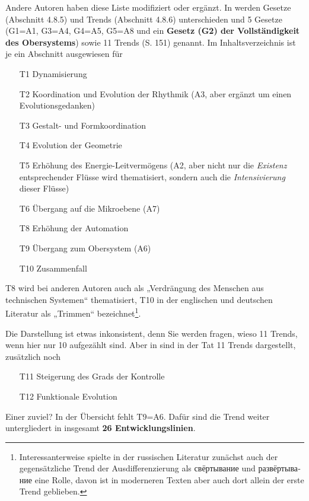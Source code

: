 \documentclass[11pt,a4paper]{article}
\begin{document}
Andere Autoren haben diese Liste modifiziert oder ergänzt.  In \cite[Abschnitt
  4.8]{Koltze2017} werden Gesetze (Abschnitt 4.8.5) und Trends (Abschnitt
4.8.6) unterschieden und 5 Gesetze (G1=A1, G3=A4, G4=A5, G5=A8 und ein
\textbf{Gesetz (G2) der Vollständigkeit des Obersystems}) sowie 11 Trends
(S. 151) genannt. Im Inhaltsverzeichnis ist je ein Abschnitt ausgewiesen für
\begin{itemize}[noitemsep]
\item[T1] Dynamisierung
\item[T2] Koordination und Evolution der Rhythmik (A3, aber ergänzt um einen
  Evolutionsgedanken)
\item[T3] Gestalt- und Formkoordination
\item[T4] Evolution der Geometrie
\item[T5] Erhöhung des Energie-Leitvermögens (A2, aber nicht nur die
  \emph{Existenz} entsprechender Flüsse wird thematisiert, sondern auch die
  \emph{Intensivierung} dieser Flüsse)
\item[T6] Übergang auf die Mikroebene (A7)
\item[T8] Erhöhung der Automation 
\item[T9] Übergang zum Obersystem (A6)
\item[T10] Zusammenfall 
\end{itemize}
\newpage
T8 wird bei anderen Autoren auch als „Verdrängung des Menschen aus technischen
Systemen“ thematisiert, T10 in der englischen und deutschen Literatur als
„Trimmen“ bezeichnet\footnote{Interessanterweise spielte in der russischen
  Literatur zunächst auch der gegensätzliche Trend der Ausdifferenzierung als
  \foreignlanguage{russian}{свёртывание} und
  \foreignlanguage{russian}{развёртывание} eine Rolle, davon ist in moderneren
  Texten aber auch dort allein der erste Trend geblieben.}.

Die Darstellung ist etwas inkonsistent, denn Sie werden fragen, wieso 11
Trends, wenn hier nur 10 aufgezählt sind. Aber in \cite[Abb. 4.65]{Koltze2017}
sind in der Tat 11 Trends dargestellt, zusätzlich noch
\begin{itemize}[noitemsep]
\item[T11] Steigerung des Grads der Kontrolle
\item[T12] Funktionale Evolution
\end{itemize}
Einer zuviel? In der Übersicht fehlt T9=A6.  Dafür sind die Trend weiter
untergliedert in insgesamt \textbf{26 Entwicklungslinien}.
\end{document}
